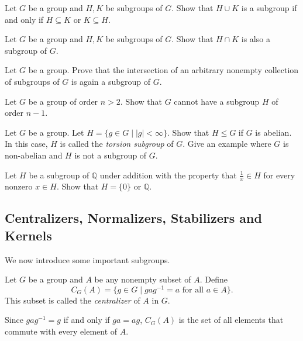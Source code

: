 \begin{exercise}
    Let $G$ be a group and $H,K$ be subgroups of $G$. Show that $H\cup K$ is a subgroup if and only if $H\subseteq K$ or $K\subseteq H$.
\end{exercise}

\begin{exercise}
    Let $G$ be a group and $H,K$ be subgroups of $G$. Show that $H\cap K$ is also a subgroup of $G$.
\end{exercise}

\begin{exercise}
\label{subgrIntersubgr}
    Let $G$ be a group. Prove that the intersection of an arbitrary nonempty collection of subgroups of $G$ is again a subgroup of $G$.
\end{exercise}

\begin{exercise}
    Let $G$ be a group of order $n>2$. Show that $G$ cannot have a subgroup $H$ of order $n-1$.
\end{exercise}

\begin{exercise}
    Let $G$ be a group. Let $H=\{g\in G\mid |g|<\infty\}$. Show that $H\leq G$ if $G$ is abelian. In this case, $H$ is called the \textit{torsion subgroup} of $G$. Give an example where $G$ is non-abelian and $H$ is not a subgroup of $G$.
\end{exercise}

\begin{exercise}
    Let $H$ be a subgroup of $\mathbb{Q}$ under addition with the property that $\frac 1x\in H$ for every nonzero $x\in H$. Show that $H=\{0\}$ or $\mathbb{Q}$.
\end{exercise}



\subsection{Centralizers, Normalizers, Stabilizers and Kernels}

We now introduce some important subgroups.

\begin{definition}
    Let $G$ be a group and $A$ be any nonempty subset of $A$. Define
    $$C_G(A)=\{g\in G\mid gag^{-1}=a\text{ for all }a\in A\}.$$
    This subset is called the \textit{centralizer} of $A$ in $G$.
\end{definition}

Since $gag^{-1}=g$ if and only if $ga=ag$, $C_G(A)$ is the set of all elements that commute with every element of $A$.

